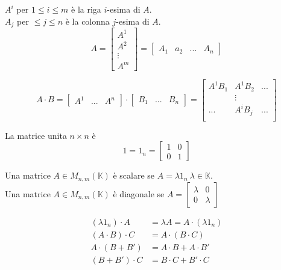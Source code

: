 \newpage
\begin{notazione}[$A\in M _{m,n}(\mathbb{K})$]
  $ A^i $ per $1\leq i\leq m$ è la riga $i$-esima di $A$. \\
  $A_j$ per $\leq j\leq n$ è la colonna $j$-esima di $A$.
  \begin{equation}
    A = \begin{bmatrix}
      A^1 \\
      A^2 \\
      \vdots \\
      A^m
    \end{bmatrix} = \begin{bmatrix}
    A_1 & a_2 & ... & A_n
    \end{bmatrix}
    \label{eq:rige_colonne}
  \end{equation}
\end{notazione}
\begin{equation}
  A\cdot B = \begin{bmatrix}
    A^1 & ... & A^n
  \end{bmatrix} \cdot \begin{bmatrix}
    B_1 & ... & B_n
  \end{bmatrix} = \begin{bmatrix}
    A^1 B_1 & A^1 B_2 & ... \\
            & \vdots \\
    ... & A^i B_j & ... \\
  \end{bmatrix}
  \label{eq:mat_riga_per_colonna}
\end{equation}

\begin{notazione}[]
  La matrice unita $n\times n$ è
  \begin{equation}
    1 = 1_n = \begin{bmatrix}
      1 & 0 \\
      0 & 1
    \end{bmatrix}
    \label{eq:mat_unita}
  \end{equation}

  Una matrice $A\in M _{n,m}(\mathbb{K})$ è scalare se $A=\lambda 1_n\ \lambda \in \mathbb{K}$. \\
  Una matrice $A\in M _{n,m}(\mathbb{K})$ è diagonale se $A=\begin{bmatrix}
    \lambda & 0 \\
    0 & \lambda 
  \end{bmatrix}$
\end{notazione}
\begin{proprieta}
  \begin{align}
    (\lambda 1_n)\cdot A &= \lambda A = A\cdot (\lambda 1_n) \label{prop_alg_1} \\
    (A\cdot B) \cdot C &= A\cdot (B\cdot C) \label{prop_alg_2} \\
    A\cdot (B+B') & = A\cdot B + A\cdot B' \label{prop_alg_3} \\
    (B+B') \cdot C & = B\cdot C+B' \cdot C \label{prop_alg_4}
  \end{align}
\end{proprieta}

